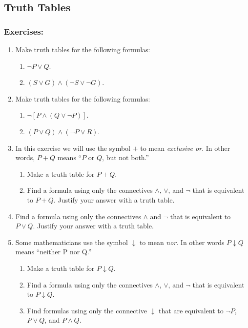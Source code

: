 \subsection{Truth Tables}
\subsubsection{Exercises:}
\begin{enumerate}
\item Make truth tables for the following formulas:
  \begin{enumerate} 
  \item $\neg P \lor Q$.
  \item $(S \lor G) \land (\neg S \lor \neg G)$.
  \end{enumerate}
  
\item Make truth tables for the following formulas:
  \begin{enumerate}
  \item $\neg [P \land (Q \lor \neg P)]$.
  \item $(P \lor Q) \land (\neg P \lor R)$.
  \end{enumerate}

\item In this exercise we will use the symbol $+$ to mean \emph{exclusive or}. In other words, $P + Q$ means ``$P$ or $Q$, but not both.''
  \begin{enumerate}
  \item Make a truth table for $P + Q$.
  \item Find a formula using only the connectives $\land$, $\lor$, and $\neg$ that is equivalent to $P + Q$. Justify your answer with a truth table.
  \end{enumerate}

\item Find a formula using only the connectives $\land$ and $\neg$ that is equivalent to $P \lor Q$. Justify your answer with a truth table.

\item Some mathematicians use the symbol $\downarrow$ to mean \emph{nor}. In other words $P \downarrow Q$ means ``neither P nor Q.''
  \begin{enumerate}
  \item Make a truth table for $P \downarrow Q$.
  \item Find a formula using only the connectives $\land$, $\lor$, and $\neg$ that is equivalent to $P \downarrow Q$.
  \item Find formulas using only the connective $\downarrow$ that are equivalent to $\neg P$, $P \lor Q$, and $P \land Q$.
  \end{enumerate}


\end{enumerate}
